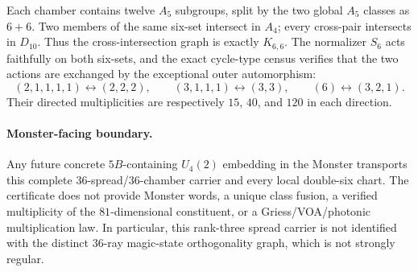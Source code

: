Each chamber contains twelve $A_5$ subgroups, split by the two global $A_5$
classes as $6+6$.  Two members of the same six-set intersect in $A_4$; every
cross-pair intersects in $D_{10}$.  Thus the cross-intersection graph is exactly
$K_{6,6}$.  The normalizer $S_6$ acts faithfully on both six-sets, and the exact
cycle-type census verifies that the two actions are exchanged by the exceptional
outer automorphism:
\[
 (2,1,1,1,1)\longleftrightarrow(2,2,2),
 \qquad
 (3,1,1,1)\longleftrightarrow(3,3),
 \qquad
 (6)\longleftrightarrow(3,2,1).
\]
Their directed multiplicities are respectively $15$, $40$, and $120$ in each
direction.

\paragraph{Monster-facing boundary.}
Any future concrete $5B$-containing $U_4(2)$ embedding in the Monster transports
this complete $36$-spread/$36$-chamber carrier and every local double-six chart.
The certificate does not provide Monster words, a unique class fusion, a verified
multiplicity of the $81$-dimensional constituent, or a Griess/VOA/photonic
multiplication law.  In particular, this rank-three spread carrier is not
identified with the distinct $36$-ray magic-state orthogonality graph, which is
not strongly regular.
